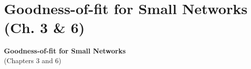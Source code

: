 \documentclass[aspectratio=169, 9pt]{beamer}
\begin{document}
\section{Goodness-of-fit for Small Networks (Ch. 3 \& 6)}

\begin{frame}[t]
\textcolor{uscgold}{
\Large {\bf Goodness-of-fit for Small Networks}\\(\small Chapters 3 and 6\Large)
}
\end{frame}
\end{document}
